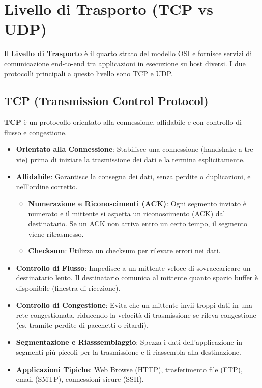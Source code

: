 \section{Livello di Trasporto (TCP vs UDP)}
Il \textbf{Livello di Trasporto} è il quarto strato del modello OSI e fornisce servizi di comunicazione end-to-end tra applicazioni in esecuzione su host diversi. I due protocolli principali a questo livello sono TCP e UDP.

\subsection{TCP (Transmission Control Protocol)}
\textbf{TCP} è un protocollo orientato alla connessione, affidabile e con controllo di flusso e congestione.
\begin{itemize}
    \item \textbf{Orientato alla Connessione}: Stabilisce una connessione (handshake a tre vie) prima di iniziare la trasmissione dei dati e la termina esplicitamente.
    \item \textbf{Affidabile}: Garantisce la consegna dei dati, senza perdite o duplicazioni, e nell'ordine corretto.
    \begin{itemize}
        \item \textbf{Numerazione e Riconoscimenti (ACK)}: Ogni segmento inviato è numerato e il mittente si aspetta un riconoscimento (ACK) dal destinatario. Se un ACK non arriva entro un certo tempo, il segmento viene ritrasmesso.
        \item \textbf{Checksum}: Utilizza un checksum per rilevare errori nei dati.
    \end{itemize}
    \item \textbf{Controllo di Flusso}: Impedisce a un mittente veloce di sovraccaricare un destinatario lento. Il destinatario comunica al mittente quanto spazio buffer è disponibile (finestra di ricezione).
    \item \textbf{Controllo di Congestione}: Evita che un mittente invii troppi dati in una rete congestionata, riducendo la velocità di trasmissione se rileva congestione (es. tramite perdite di pacchetti o ritardi).
    \item \textbf{Segmentazione e Riasssemblaggio}: Spezza i dati dell'applicazione in segmenti più piccoli per la trasmissione e li riassembla alla destinazione.
    \item \textbf{Applicazioni Tipiche}: Web Browse (HTTP), trasferimento file (FTP), email (SMTP), connessioni sicure (SSH).
\end{itemize}

